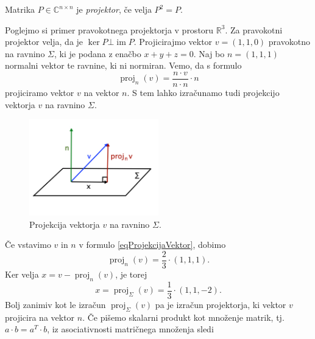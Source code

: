 \documentclass[mat1]{fmfdelo}
\newcommand{\R}{\mathbb R}
\newcommand{\C}{\mathbb C}
\DeclareMathOperator{\Ima}{im}
\begin{document}
\begin{definicija}
    Matrika $P \in \C^{n \times n}$ je \emph{projektor}, če velja $P^2 = P$.
\end{definicija}
\begin{zgled}
    Poglejmo si primer pravokotnega projektorja v prostoru $\R^3$. Za pravokotni projektor velja, da je $\ker P \bot \Ima P$. Projicirajmo vektor $v = (1,1,0)$ pravokotno na ravnino $\Sigma$, ki je podana z enačbo $x + y + z = 0$. Naj bo $n = (1,1,1)$ normalni vektor te ravnine, ki ni normiran. Vemo, da s formulo
    \begin{equation}\label{eqProjekcijaVektor}
        \operatorname{proj}_{n}(v) = \frac{n \cdot v}{n\cdot n}\cdot n
    \end{equation}
    projiciramo vektor $v$ na vektor $n$. S tem lahko izračunamo tudi projekcijo vektorja $v$ na ravnino $\Sigma$.
    \begin{figure}[H]
        \vspace{-10pt}
        \centering
        \includegraphics[width=0.5\textwidth]{projekcija.jpg}
        \vspace{-25pt}
        \caption{Projekcija vektorja $v$ na ravnino $\Sigma$.}
    \end{figure}
    Če vstavimo $v$ in $n$ v formulo \eqref{eqProjekcijaVektor}, dobimo
    \begin{equation*}
        \operatorname{proj}_{n}(v) = \frac{2}{3}\cdot (1,1,1).
    \end{equation*}
    Ker velja $x = v - \operatorname{proj}_{n}(v)$, je torej
    \begin{equation*}
        x = \operatorname{proj}_\Sigma (v) = \frac{1}{3}\cdot (1,1,-2).
    \end{equation*}
    Bolj zanimiv kot le izračun $\operatorname{proj}_\Sigma (v)$ pa je izračun projektorja, ki vektor $v$ projicira na vektor $n$. Če pišemo skalarni produkt kot množenje matrik, tj.\ $a\cdot b = a^T \cdot b$, iz asociativnosti matričnega množenja sledi
    \begin{equation*}

\end{equation*}
\end{zgled}
\end{document}
